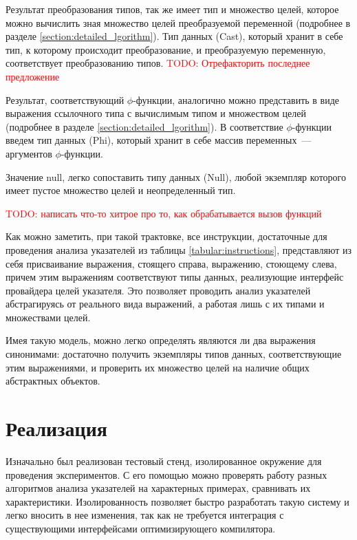 \documentclass[14pt,titlepage]{extarticle}
\newcommand{\todo}[1]{\textcolor{red}{TODO: #1}}
\newcommand{\eng}[1]{{\English#1}}
\let\oldsection\section
\renewcommand{\section}{\newpage\oldsection}
\begin{document}
      Результат преобразования типов, так же имеет тип и множество целей,
      которое можно вычислить зная множество целей преобразуемой переменной
      (подробнее в разделе \ref{section:detailed_lgorithm}). Тип данных
      (\eng{Cast}), который хранит в себе тип, к которому происходит
      преобразование, и преобразуемую переменную, соответствует преобразованию
      типов. \todo{Отрефакторить последнее предложение}

      Результат, соответствующий $\phi$-функции, аналогично можно представить в
      виде выражения ссылочного типа с вычислимым типом и множеством целей
      (подробнее в разделе \ref{section:detailed_lgorithm}). В соответствие
      $\phi$-функции введем тип данных (\eng{Phi}), который хранит в себе
      массив переменных~--- аргументов $\phi$-функции.

      Значение \eng{null}, легко сопоставить типу данных (\eng{Null}), любой
      экземпляр которого имеет пустое множество целей и неопределенный тип.

      \todo{написать что-то хитрое про то, как обрабатывается вызов функций}

      Как можно заметить, при такой трактовке, все инструкции, достаточные для
      проведения анализа указателей из таблицы \ref{tabular:instructions},
      представляют из себя присваивание выражения, стоящего
      справа, выражению, стоющему слева, причем этим выражениям соответствуют
      типы данных, реализующие интерфейс провайдера целей указателя. Это
      позволяет проводить анализ указателей абстрагируясь от реального вида
      выражений, а работая лишь с их типами и множествами целей.

      Имея такую модель, можно легко определять являются ли два выражения
      синонимами: достаточно получить экземпляры типов данных, соответствующие
      этим выражениями, и проверить их множество целей на наличие общих
      абстрактных объектов.


  \section{Реализация}

    Изначально был реализован тестовый стенд, изолированное окружение для
    проведения экспериментов. С его помощью можно проверять работу
    разных алгоритмов анализа указателей на характерных примерах, сравнивать их
    характеристики. Изолированность позволяет быстро разработать такую систему
    и легко вносить в нее изменения, так как не требуется интеграция с
    существующими интерфейсами оптимизирующего компилятора.
\end{document}
